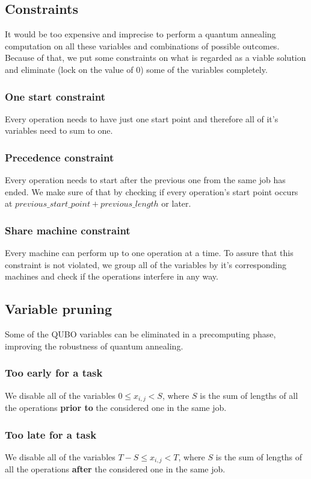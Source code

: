 \documentclass[letterpaper, 11pt]{article}
\begin{document}
\begin{multicols}{2}
\subsection{Constraints}
It would be too expensive and imprecise to perform a quantum 
annealing computation on all these variables and combinations of
possible outcomes. Because of that, we put some constraints on
what is regarded as a viable solution and eliminate (lock on the
value of 0) some of the variables completely.
\subsubsection{One start constraint}
Every operation needs to have just one start point and therefore all of
it's variables need to sum to one. 
\subsubsection{Precedence constraint}
Every operation needs to start after the previous one from the same job
has ended. We make sure of that by checking if every operation's 
start point occurs at $previous\_start\_point + previous\_length$ or later.
\subsubsection{Share machine constraint}
Every machine can perform up to one operation at a time. To assure that
this constraint is not violated, we group all of the variables by it's
corresponding machines and check if the operations interfere in any way.
\subsection{Variable pruning}
Some of the QUBO variables can be eliminated in a precomputing phase,
improving the robustness of quantum annealing. 
\subsubsection{Too early for a task}
We disable all of the variables $0 \leq x_{i,j} < S$, where $S$ is the sum of lengths of all the operations \textbf{prior to} the considered one in the same job.
\subsubsection{Too late for a task}
We disable all of the variables $T-S \leq x_{i,j} < T$, where $S$ is the sum of lengths of all the operations \textbf{after} the considered one in the same job.

\end{multicols}
\end{document}
